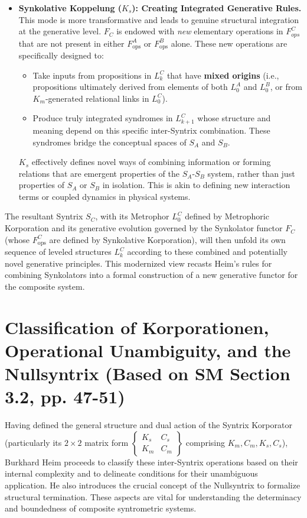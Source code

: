 \documentclass[
    12pt,              %
    a4paper,           %
    headings=normal,   %
    twoside=true,      %
    BCOR=8mm,          %
]{scrbook}
\newcommand{\korporatoroperator}{\begin{Bmatrix} K_s & C_s \\ K_m & C_m \end{Bmatrix}}
\newcommand{\fops}{F_{\text{ops}}}
\begin{document}
\begin{itemize}
    \item   \textbf{Synkolative Koppelung (\(K_s\)): Creating Integrated Generative Rules.}
        This mode is more transformative and leads to genuine structural integration at the generative level. \(F_C\) is endowed with \textit{new} elementary operations in \(F_{ops}^C\) that are not present in either \(\fops^A\) or \(\fops^B\) alone. These new operations are specifically designed to:
        \begin{itemize}
            \item   Take inputs from propositions in \(L_k^C\) that have \textbf{mixed origins} (i.e., propositions ultimately derived from elements of both \(L_0^A\) and \(L_0^B\), or from \(K_m\)-generated relational links in \(L_0^C\)).
            \item   Produce truly integrated syndromes in \(L_{k+1}^C\) whose structure and meaning depend on this specific inter-Syntrix combination. These syndromes bridge the conceptual spaces of \(S_A\) and \(S_B\).
        \end{itemize}
        \(K_s\) effectively defines novel ways of combining information or forming relations that are emergent properties of the \(S_A\)-\(S_B\) system, rather than just properties of \(S_A\) or \(S_B\) in isolation. This is akin to defining new interaction terms or coupled dynamics in physical systems.
\end{itemize}
The resultant Syntrix \(S_C\), with its Metrophor \(L_0^C\) defined by Metrophoric Korporation and its generative evolution governed by the Synkolator functor \(F_C\) (whose \(\fops^C\) are defined by Synkolative Korporation), will then unfold its own sequence of leveled structures \(L_k^C\) according to these combined and potentially novel generative principles. This modernized view recasts Heim's rules for combining Synkolators into a formal construction of a new generative functor for the composite system.

\section{Classification of Korporationen, Operational Unambiguity, and the Nullsyntrix (Based on SM Section 3.2, pp. 47-51)}
\label{sec:ch3_classification_korp_null} 

Having defined the general structure and dual action of the Syntrix Korporator (particularly its \(2 \times 2\) matrix form \(\korporatoroperator\) comprising \(K_m, C_m, K_s, C_s\)), Burkhard Heim proceeds to classify these inter-Syntrix operations based on their internal complexity and to delineate conditions for their unambiguous application. He also introduces the crucial concept of the Nullsyntrix to formalize structural termination. These aspects are vital for understanding the determinacy and boundedness of composite syntrometric systems.
\end{document}
